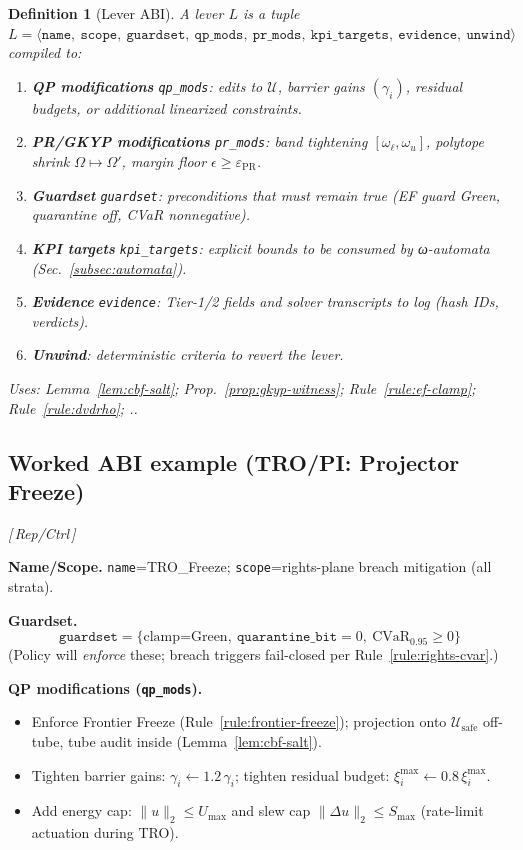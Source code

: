 \documentclass[10pt]{article}
\makeatletter
\newcommand{\uses}[1]{\par\smallskip\noindent\textit{Uses: }#1.\par\smallskip}
\newcommand{\layertag}[1]{\textsf{\footnotesize[\,#1\,]}}
\newcommand{\JSGxref}[2]{%
  \@ifundefined{r@#2}{\textbf{[#1 ??]}}{#1~\ref{#2}}}
\newcommand{\secref}[1]{\JSGxref{§}{#1}}
\providecommand{\constsymPRmargin}{\varepsilon_{\mathrm{PR}}}
\providecommand{\constsymomegal}{\omega_{\ell}}
\providecommand{\constsymomegau}{\omega_{u}}
\newtheorem{definition}{Definition}
\makeatother
\begin{document}
\begin{definition}[Lever ABI]\label{def:lever-abi}
A lever $L$ is a tuple
\(
L=\langle\texttt{name},\ \texttt{scope},\ \texttt{guardset},\ \texttt{qp\_mods},\ \texttt{pr\_mods},\ \texttt{kpi\_targets},\ \texttt{evidence},\ \texttt{unwind}\rangle
\)
compiled to:
\begin{enumerate}[leftmargin=*]
\item \textbf{QP modifications} \texttt{qp\_mods}: edits to $\mathcal U$, barrier gains $(\gamma_i)$, residual budgets, or additional linearized constraints.
\item \textbf{PR/GKYP modifications} \texttt{pr\_mods}: band tightening $[\constsymomegal,\constsymomegau]$, polytope shrink $\Omega\mapsto\Omega'$, margin floor $\epsilon\ge \constsymPRmargin$.
\item \textbf{Guardset} \texttt{guardset}: preconditions that must remain true (EF guard Green, quarantine off, CVaR nonnegative).
\item \textbf{KPI targets} \texttt{kpi\_targets}: explicit bounds to be consumed by ω-automata (Sec.~\ref{subsec:automata}).
\item \textbf{Evidence} \texttt{evidence}: Tier-1/2 fields and solver transcripts to log (hash IDs, verdicts).
\item \textbf{Unwind}: deterministic criteria to revert the lever.
\end{enumerate}
\uses{Lemma~\ref{lem:cbf-salt}; Prop.~\ref{prop:gkyp-witness}; Rule~\ref{rule:ef-clamp}; Rule~\ref{rule:dvdrho}; \secref{subsec:automata}.}
\end{definition}

\subsection{Worked ABI example (TRO/PI: Projector Freeze)}\label{subsec:lever-example}
\emph{\layertag{Rep/Ctrl}}

\noindent\textbf{Name/Scope.} \texttt{name}=\textsf{TRO\_Freeze}; \texttt{scope}=\textsf{rights-plane breach mitigation (all strata)}.

\smallskip
\noindent\textbf{Guardset.}
\[
\texttt{guardset}=\{\text{clamp=Green},\ \texttt{quarantine\_bit}=0,\ \mathrm{CVaR}_{0.95}\ge0\}
\]
(Policy will \emph{enforce} these; breach triggers fail-closed per Rule~\ref{rule:rights-cvar}.)

\smallskip
\noindent\textbf{QP modifications (\texttt{qp\_mods}).}
\begin{itemize}[leftmargin=*]
\item Enforce Frontier Freeze (Rule~\ref{rule:frontier-freeze}); projection onto $\mathcal U_{\mathrm{safe}}$ off-tube, tube audit inside (Lemma~\ref{lem:cbf-salt}).
\item Tighten barrier gains: $\gamma_i\!\leftarrow\!1.2\,\gamma_i$; tighten residual budget: $\xi_i^{\max}\!\leftarrow\!0.8\,\xi_i^{\max}$.
\item Add energy cap: $\|u\|_2\le U_{\max}$ and slew cap $\|\Delta u\|_2\le S_{\max}$ (rate-limit actuation during TRO).
\end{itemize}
\end{document}
